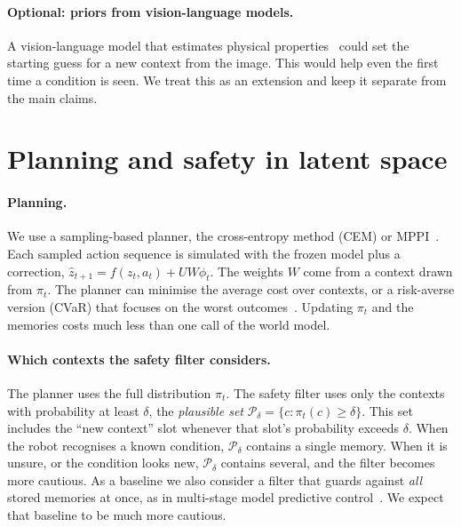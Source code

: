 \documentclass[10pt]{article}
\newcommand{\Pd}{\mathcal{P}_\delta}
\begin{document}
\paragraph{Optional: priors from vision-language models.}
A vision-language model that estimates physical properties~\cite{gao2024physically,wang2026phys2real}
could set the starting guess for a new context from the image. This would help even the first time a
condition is seen. We treat this as an extension and keep it separate from the main claims.

\section{Planning and safety in latent space}\label{sec:safety}

\paragraph{Planning.}
We use a sampling-based planner, the cross-entropy method (CEM) or MPPI~\cite{rubinstein1999cem,chua2018pets}.
Each sampled action sequence is simulated with the frozen model plus a correction,
$\hat z_{t+1}=f(z_t,a_t)+UW\phi_t$. The weights $W$ come from a context drawn from $\pi_t$. The planner
can minimise the average cost over contexts, or a risk-averse version (CVaR) that focuses on the worst
outcomes~\cite{yin2023risk,lew2024risk}. Updating $\pi_t$ and the memories costs much less than one
call of the world model.

\paragraph{Which contexts the safety filter considers.}
The planner uses the full distribution $\pi_t$. The safety filter uses only the contexts with
probability at least $\delta$, the \emph{plausible set} $\Pd=\{c:\pi_t(c)\ge\delta\}$. This set includes
the ``new context'' slot whenever that slot's probability exceeds $\delta$. When the robot recognises
a known condition, $\Pd$ contains a single memory. When it is unsure, or the condition looks new, $\Pd$
contains several, and the filter becomes more cautious. As a baseline we also consider a filter that
guards against \emph{all} stored memories at once, as in multi-stage model predictive
control~\cite{lucia2013multistage}. We expect that baseline to be much more cautious.
\end{document}
